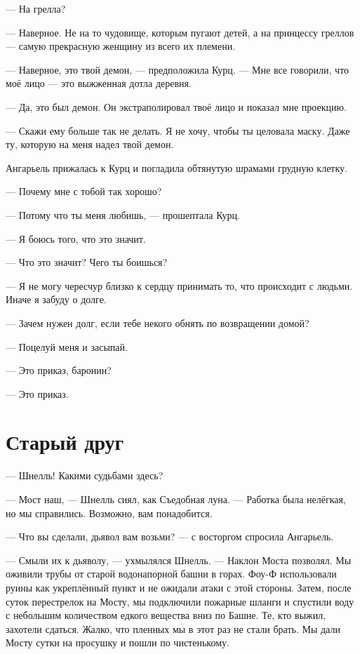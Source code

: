 --- На грелла?

--- Наверное.
Не на то чудовище, которым пугают детей, а на принцессу греллов --- самую прекрасную женщину из всего их племени.

--- Наверное, это твой демон, --- предположила Курц.
--- Мне все говорили, что моё лицо --- это выжженная дотла деревня.

--- Да, это был демон.
Он экстраполировал твоё лицо и показал мне проекцию.

--- Скажи ему больше так не делать.
Я не хочу, чтобы ты целовала маску.
Даже ту, которую на меня надел твой демон.

Ангарьель прижалась к Курц и погладила обтянутую шрамами грудную клетку.

--- Почему мне с тобой так хорошо?

--- Потому что ты меня любишь, --- прошептала Курц.

--- Я боюсь того, что это значит.

--- Что это значит?
Чего ты боишься?

--- Я не могу чересчур близко к сердцу принимать то, что происходит с людьми.
Иначе я забуду о долге.

--- Зачем нужен долг, если тебе некого обнять по возвращении домой?

--- Поцелуй меня и засыпай.

--- Это приказ, баронин?

--- Это приказ.

\section{Старый друг}

--- Шнелль!
Какими судьбами здесь?

--- Мост наш, --- Шнелль сиял, как Съедобная луна.
--- Работка была нелёгкая, но мы справились.
Возможно, вам понадобится.

--- Что вы сделали, дьявол вам возьми? --- с восторгом спросила Ангарьель.

--- Смыли их к дьяволу, --- ухмылялся Шнелль.
--- Наклон Моста позволял.
Мы оживили трубы от старой водонапорной башни в горах.
Фоу-Ф использовали руины как укреплённый пункт и не ожидали атаки с этой стороны.
Затем, после суток перестрелок на Мосту, мы подключили пожарные шланги и спустили воду с небольшим количеством едкого вещества вниз по Башне.
Те, кто выжил, захотели сдаться.
Жалко, что пленных мы в этот раз не стали брать.
Мы дали Мосту сутки на просушку и пошли по чистенькому.

